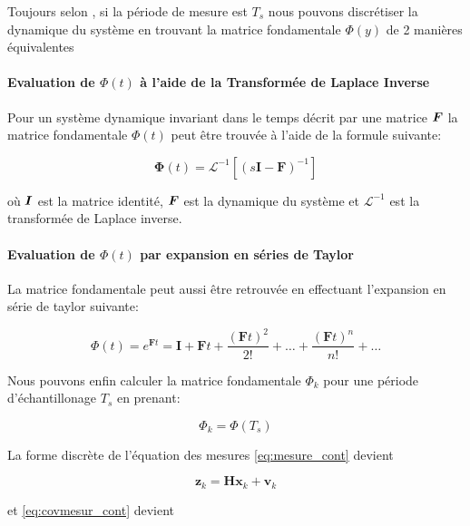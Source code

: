 \documentclass[12pt,a4paper]{report}
\begin{document}
	\para Toujours selon \cite{zarchan_fundamentals_2009}, si la période de mesure est $T_s$ nous pouvons discrétiser la dynamique du système en trouvant la matrice fondamentale $\Phi(y)$ de 2 manières équivalentes
	
	\paragraph*{Evaluation de $\Phi(t)$ à l'aide de la Transformée de Laplace Inverse}
	
	\para Pour un système dynamique invariant dans le temps décrit par une matrice $\boldsymbol{F}$ la matrice fondamentale $\Phi(t)$ peut être trouvée à l'aide de la formule suivante:
	
	\begin{equation}
	\boldsymbol \Phi(t) =  \mathcal{L}^{-1}[(s\boldsymbol{I-F})^{-1}]
	\end{equation}
	
	\para où $\boldsymbol{I}$ est la matrice identité, $\boldsymbol{F}$ est la dynamique du système et $\mathcal{L}^{-1}$ est la transformée de Laplace inverse.
	
	\paragraph*{Evaluation de $\Phi(t)$ par expansion en séries de Taylor}
	\para La matrice fondamentale peut aussi être retrouvée en effectuant l'expansion en série de taylor suivante:
	
	\begin{equation}
	 \Phi(t) = e^{\boldsymbol Ft} = \boldsymbol I + \boldsymbol Ft + \frac{(\boldsymbol Ft)^2}{2!} + \dots + \frac{(\boldsymbol Ft)^n}{n!} + \dots
	\end{equation}
	
	\para Nous pouvons enfin calculer la matrice fondamentale $\Phi_k$ pour une période d'échantillonage $T_s$ en prenant:
	
	\begin{equation}
	\Phi_k = \Phi(T_s)
	\end{equation}
	
	\para La forme discrète de l'équation des mesures \ref{eq:mesure_cont} devient
	
	\begin{equation}
	 \boldsymbol z_k = \boldsymbol H \boldsymbol x_k +\boldsymbol  v_k
	\end{equation}
	
	\para et \ref{eq:covmesur_cont} devient
	
\end{document}
